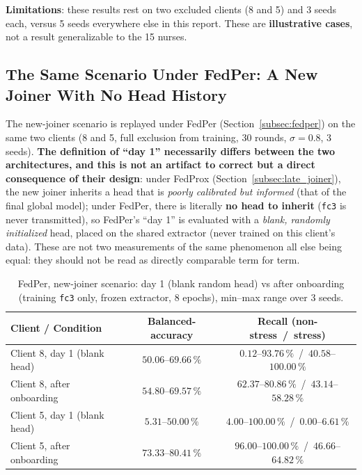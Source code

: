 \documentclass{article}
\begin{document}
\textbf{Limitations}: these results rest on two excluded clients (8 and 5) and 3
seeds each, versus 5 seeds everywhere else in this report. These are
\textbf{illustrative cases}, not a result generalizable to the 15 nurses.

\subsection{The Same Scenario Under FedPer: A New Joiner With No Head History}
\label{subsec:fedper_late_joiner}

The new-joiner scenario is replayed under FedPer (Section~\ref{subsec:fedper}) on
the same two clients (8 and 5, full exclusion from training, 30 rounds,
$\sigma=0.8$, 3 seeds). \textbf{The definition of ``day 1'' necessarily differs
between the two architectures, and this is not an artifact to correct but a
direct consequence of their design}: under FedProx
(Section~\ref{subsec:late_joiner}), the new joiner inherits a head that is
\emph{poorly calibrated but informed} (that of the final global model); under
FedPer, there is literally \textbf{no head to inherit} (\texttt{fc3} is never
transmitted), so FedPer's ``day 1'' is evaluated with a \emph{blank, randomly
initialized} head, placed on the shared extractor (never trained on this
client's data). These are not two measurements of the same phenomenon all else
being equal: they should not be read as directly comparable term for term.

\begin{table}[h!]
  \centering
  \caption{FedPer, new-joiner scenario: day 1 (blank random head) vs after
  onboarding (training \texttt{fc3} only, frozen extractor, 8 epochs), min--max
  range over 3 seeds.}
  \label{tab:fedper_late_joiner}
  \begin{tabular}{lcc}
    \toprule
    Client / Condition & Balanced-accuracy & Recall (non-stress~/~stress) \\
    \midrule
    Client 8, day 1 (blank head)   & $50.06$--$69.66\,\%$ & $0.12$--$93.76\,\%$~/~$40.58$--$100.00\,\%$ \\
    Client 8, after onboarding       & $54.80$--$69.57\,\%$ & $62.37$--$80.86\,\%$~/~$43.14$--$58.28\,\%$ \\
    \addlinespace
    Client 5, day 1 (blank head)   & $5.31$--$50.00\,\%$  & $4.00$--$100.00\,\%$~/~$0.00$--$6.61\,\%$ \\
    Client 5, after onboarding       & $73.33$--$80.41\,\%$ & $96.00$--$100.00\,\%$~/~$46.66$--$64.82\,\%$ \\
    \bottomrule
  \end{tabular}
\end{table}
\end{document}
